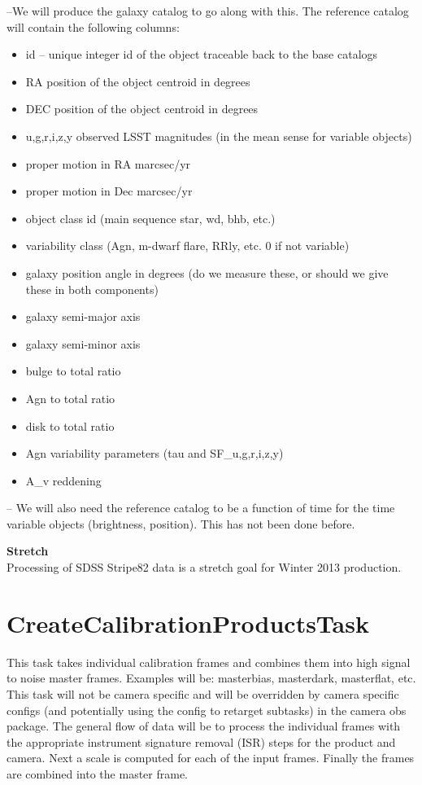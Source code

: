 \documentclass[12pt]{article}
\begin{document}
--We will produce the galaxy catalog to
go along with this.  The reference catalog will contain the following
columns:
\begin{itemize}
\item id -- unique integer id of the object traceable back to the base catalogs
\item RA position of the object centroid in degrees
\item DEC position of the object centroid in degrees
\item {u,g,r,i,z,y} observed LSST magnitudes (in the mean sense for variable objects)
\item proper motion in RA marcsec/yr
\item proper motion in Dec marcsec/yr
\item object class id (main sequence star, wd, bhb, etc.)
\item variability class (Agn, m-dwarf flare, RRly, etc. 0 if not variable)
\item galaxy position angle in degrees (do we measure these, or should we give these in both components)
\item galaxy semi-major axis 
\item galaxy semi-minor axis
\item bulge to total ratio
\item Agn to total ratio
\item disk to total ratio
\item Agn variability parameters (tau and SF\_{u,g,r,i,z,y})
\item A\_v reddening 
\end{itemize}

-- We will also need the reference catalog to be a function of time for
the time variable objects (brightness, position).  This has not been
done before.

{\bf Stretch}\\
Processing of SDSS Stripe82 data is a stretch goal for Winter 2013
production.


\clearpage 
\section{CreateCalibrationProductsTask} 
This task takes individual calibration frames and combines them into
high signal to noise master frames.  Examples will be: masterbias, masterdark, masterflat, etc.  
This task will not be camera specific and will be overridden by camera specific configs (and potentially
using the config to retarget subtasks) in the camera obs package.  The general flow of data will be to process the individual frames
with the appropriate instrument signature removal (ISR) steps for the product and camera.  Next a scale is computed for each of the input
frames.  Finally the frames are combined into the master frame.
\end{document}
